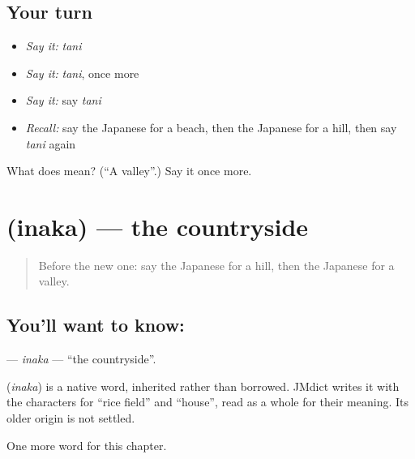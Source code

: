 \subsection*{Your turn}
\begin{itemize}
\raggedright
  \item \emph{Say it:} \emph{tani}
  \item \emph{Say it:} \emph{tani}, once more
  \item \emph{Say it:} say \emph{tani}
  \item \emph{Recall:} say the Japanese for a beach, then the Japanese for a hill, then say \emph{tani} again
\end{itemize}

\begin{tcolorbox}[breakable,colback=teal!4,colframe=teal!35!black,title={Before you move on}]
What does  mean? (\textquotedblleft{}A valley\textquotedblright{}.) Say it once more.
\end{tcolorbox}
\section[\texorpdfstring{\ja{いなか} (inaka)}{いなか (inaka)}]{ (inaka) — the countryside}

\label{lesson:JA-C68-inaka}



\begin{quote}
Before the new one: say the Japanese for a hill, then the Japanese for a valley.
\end{quote}

\subsection*{You'll want to know: }
\textbf{} — \emph{inaka} — \textquotedblleft{}the countryside\textquotedblright{}.

\begin{cousinweb}
\textbf{} (\emph{inaka}) is a native word, inherited rather than borrowed. JMdict writes it with the characters for \textquotedblleft{}rice field\textquotedblright{} and \textquotedblleft{}house\textquotedblright{}, read as a whole for their meaning. Its older origin is not settled.
\end{cousinweb}

\begin{grammarlens}[title={What you've built}]
One more word for this chapter.
\end{grammarlens}

